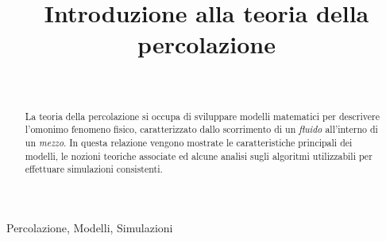 \documentclass[journal]{IEEEtran}
\theoremstyle{definition}
\begin{document}
\title{Introduzione alla teoria della percolazione}

\author{
\\
}

\maketitle

\begin{abstract}
	La teoria della percolazione si occupa di sviluppare modelli matematici per descrivere l'omonimo 
	fenomeno fisico, caratterizzato dallo scorrimento di un \textit{fluido} 
	all'interno di un \textit{mezzo}. In questa relazione vengono mostrate le caratteristiche
	principali dei modelli, le nozioni teoriche associate ed alcune analisi sugli algoritmi 
	utilizzabili per effettuare simulazioni consistenti.   
\end{abstract}

\begin{IEEEkeywords}
Percolazione, Modelli, Simulazioni
\end{IEEEkeywords}









\end{document}

